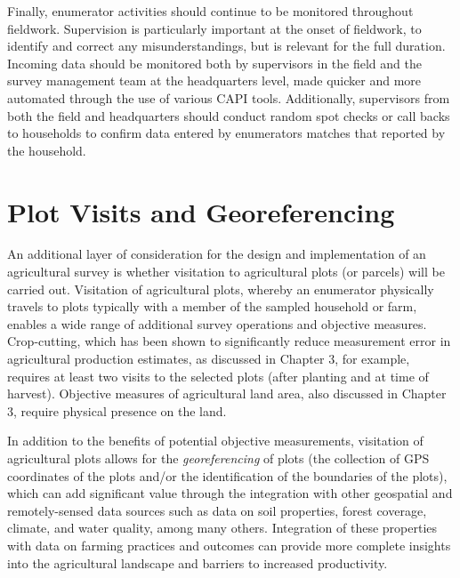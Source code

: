 \documentclass[
]{book}
\begin{document}
Finally, enumerator activities should continue to be monitored throughout fieldwork. Supervision is particularly important at the onset of fieldwork, to identify and correct any misunderstandings, but is relevant for the full duration. Incoming data should be monitored both by supervisors in the field and the survey management team at the headquarters level, made quicker and more automated through the use of various CAPI tools. Additionally, supervisors from both the field and headquarters should conduct random spot checks or call backs to households to confirm data entered by enumerators matches that reported by the household.

\hypertarget{plot-visits-and-georeferencing}{%
\section{Plot Visits and Georeferencing}\label{plot-visits-and-georeferencing}}

An additional layer of consideration for the design and implementation of an agricultural survey is whether visitation to agricultural plots (or parcels) will be carried out. Visitation of agricultural plots, whereby an enumerator physically travels to plots typically with a member of the sampled household or farm, enables a wide range of additional survey operations and objective measures. Crop-cutting, which has been shown to significantly reduce measurement error in agricultural production estimates, as discussed in Chapter 3, for example, requires at least two visits to the selected plots (after planting and at time of harvest). Objective measures of agricultural land area, also discussed in Chapter 3, require physical presence on the land.

In addition to the benefits of potential objective measurements, visitation of agricultural plots allows for the \emph{georeferencing} of plots (the collection of GPS coordinates of the plots and/or the identification of the boundaries of the plots), which can add significant value through the integration with other geospatial and remotely-sensed data sources such as data on soil properties, forest coverage, climate, and water quality, among many others. Integration of these properties with data on farming practices and outcomes can provide more complete insights into the agricultural landscape and barriers to increased productivity.
\end{document}
